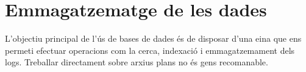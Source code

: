 \chapter{Emmagatzematge de les dades}\label{ch:log-storing}

L’objectiu principal de l’ús de bases de dades és de disposar d’una eina que ens permeti efectuar operacions com la cerca, indexació i emmagatzemament dels logs.
Treballar directament sobre arxius plans no és gens recomanable.

\clearpage

\clearpage
